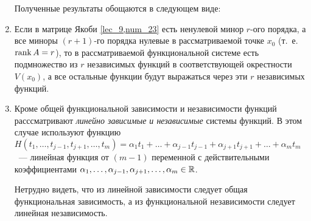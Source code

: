\documentclass[../../main.tex]{subfiles}
\begin{document}
\begin{rems}

	\begin{enumerate}
		Полученные результаты обощаются в следующем виде:
		
		\item
		Если в матрице Якоби \eqref{lec_9,num_23} есть ненулевой 
		минор $r$-ого порядка, а все миноры $(r+1)$-го 
		порядка нулевые 
		в рассматриваемой точке $x_0$ (т.~е. $\operatorname{rank} A = r$), то в 
		рассматриваемой функциональной системе есть подмножество 
		из $r$ независимых функций в соответствующей окрестности 
		$V(x_0)$, а все остальные функции будут выражаться через 
		эти $r$ независимых функций.
		
		\item
		Кроме общей функциональной зависимости и независимости 
		функций расссматривают \emph{линейно зависимые и независимые} 
		системы функций. В этом случае используют функцию 
		$H( t_1, \ldots, t_{j-1}, t_{j+1}, \ldots, t_m 
		) = \alpha_1 t_1 + \ldots + \alpha_{j-1} t_{j-1} + 
		\alpha_{j+1} t_{j+1} + \ldots + \alpha_m t_m$~--- 
		линейная функция от $(m-1)$ переменной с действительными 
		коэффициентами $\alpha_1, \ldots, \alpha_{j-1}, 
		\alpha_{j+1}, \ldots, \alpha_m \in \mathbb{R}$.
	
		Нетрудно видеть, что из линейной зависимости следует 
		общая функциональная зависимость, а из функциональной 
		независимости следует линейная независимость.
	\end{enumerate}
\end{rems}
\end{document}
